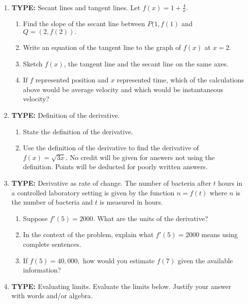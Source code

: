 \documentclass[11pt,fleqn]{article}
\begin{document}
\renewcommand{\headrulewidth}{0pt}
\newcommand{\blank}[1]{\rule{#1}{0.75pt}}
\newcommand{\bc}{\begin{center}}
\newcommand{\ec}{\end{center}}
\renewcommand{\d}{\displaystyle}

\vspace*{-0.7in}

\begin{center}
  \large
  \\ \vfill
\end{center}
\vspace*{-3in}
\begin{enumerate}
\item \textbf{TYPE:} Secant lines and tangent lines.
Let $f(x)=1+ \frac{4}{x}.$
\begin{enumerate}
	\item Find the slope of the secant line between $P(1,f(1)$ and $Q=(2,f(2)).$
	\item Write an equation of the tangent line to the graph of $f(x)$ at $x=2.$
	\item Sketch $f(x)$, the tangent line and the secant line on the same axes.
	\item If $f$ represented position and $x$ represented time, which of the calculations above would be average velocity and which would be instantaneous velocity?
\end{enumerate}

\vfill
\item  \textbf{TYPE:} Definition of the derivative.
\begin{enumerate}
	\item State the definition of the derivative.
	\item Use the definition of the derivative to find the derivative of $f(x)=\sqrt{3x}.$ No credit will be given for answers not using the definition. Points will be deducted for poorly written answers.
\end{enumerate}
\vfill
\newpage
\item \textbf{TYPE:} Derivative as rate of change. 
The  number of bacteria after $t$ hours in a controlled laboratory setting is given by the function $n=f(t)$ where $n$ is the number of bacteria and $t$ is measured in hours.
\begin{enumerate}
	\item Suppose $f'(5)=2000.$ What are the units of the derivative?
	\vfill
	\item In the context of the problem, explain what $f'(5)=2000$ means using complete sentences. 
	\vfill
	\item If $f(5)=40,000,$ how would you estimate $f(7)$ given the available information?
\end{enumerate} 
\vfill
\item \textbf{TYPE:} Evaluating limits.
Evaluate the limits below. Justify your answer with words and/or algebra.


\end{enumerate}
\end{document}
